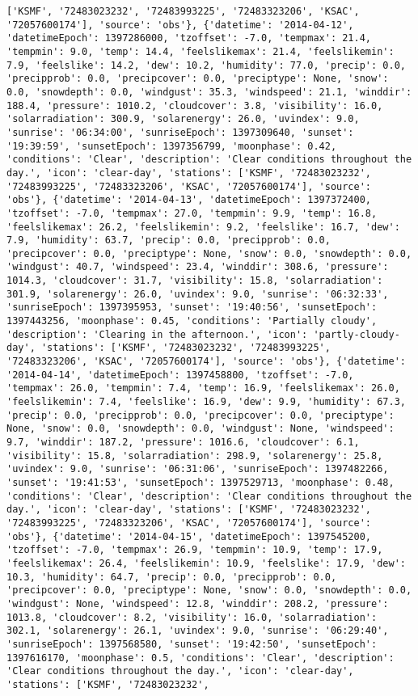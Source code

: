 \documentclass[
  letterpaper,
  DIV=11,
  numbers=noendperiod]{scrartcl}
\begin{document}
\begin{verbatim}
['KSMF', '72483023232', '72483993225', '72483323206', 'KSAC', '72057600174'], 'source': 'obs'}, {'datetime': '2014-04-12', 'datetimeEpoch': 1397286000, 'tzoffset': -7.0, 'tempmax': 21.4, 'tempmin': 9.0, 'temp': 14.4, 'feelslikemax': 21.4, 'feelslikemin': 7.9, 'feelslike': 14.2, 'dew': 10.2, 'humidity': 77.0, 'precip': 0.0, 'precipprob': 0.0, 'precipcover': 0.0, 'preciptype': None, 'snow': 0.0, 'snowdepth': 0.0, 'windgust': 35.3, 'windspeed': 21.1, 'winddir': 188.4, 'pressure': 1010.2, 'cloudcover': 3.8, 'visibility': 16.0, 'solarradiation': 300.9, 'solarenergy': 26.0, 'uvindex': 9.0, 'sunrise': '06:34:00', 'sunriseEpoch': 1397309640, 'sunset': '19:39:59', 'sunsetEpoch': 1397356799, 'moonphase': 0.42, 'conditions': 'Clear', 'description': 'Clear conditions throughout the day.', 'icon': 'clear-day', 'stations': ['KSMF', '72483023232', '72483993225', '72483323206', 'KSAC', '72057600174'], 'source': 'obs'}, {'datetime': '2014-04-13', 'datetimeEpoch': 1397372400, 'tzoffset': -7.0, 'tempmax': 27.0, 'tempmin': 9.9, 'temp': 16.8, 'feelslikemax': 26.2, 'feelslikemin': 9.2, 'feelslike': 16.7, 'dew': 7.9, 'humidity': 63.7, 'precip': 0.0, 'precipprob': 0.0, 'precipcover': 0.0, 'preciptype': None, 'snow': 0.0, 'snowdepth': 0.0, 'windgust': 40.7, 'windspeed': 23.4, 'winddir': 308.6, 'pressure': 1014.3, 'cloudcover': 31.7, 'visibility': 15.8, 'solarradiation': 301.9, 'solarenergy': 26.0, 'uvindex': 9.0, 'sunrise': '06:32:33', 'sunriseEpoch': 1397395953, 'sunset': '19:40:56', 'sunsetEpoch': 1397443256, 'moonphase': 0.45, 'conditions': 'Partially cloudy', 'description': 'Clearing in the afternoon.', 'icon': 'partly-cloudy-day', 'stations': ['KSMF', '72483023232', '72483993225', '72483323206', 'KSAC', '72057600174'], 'source': 'obs'}, {'datetime': '2014-04-14', 'datetimeEpoch': 1397458800, 'tzoffset': -7.0, 'tempmax': 26.0, 'tempmin': 7.4, 'temp': 16.9, 'feelslikemax': 26.0, 'feelslikemin': 7.4, 'feelslike': 16.9, 'dew': 9.9, 'humidity': 67.3, 'precip': 0.0, 'precipprob': 0.0, 'precipcover': 0.0, 'preciptype': None, 'snow': 0.0, 'snowdepth': 0.0, 'windgust': None, 'windspeed': 9.7, 'winddir': 187.2, 'pressure': 1016.6, 'cloudcover': 6.1, 'visibility': 15.8, 'solarradiation': 298.9, 'solarenergy': 25.8, 'uvindex': 9.0, 'sunrise': '06:31:06', 'sunriseEpoch': 1397482266, 'sunset': '19:41:53', 'sunsetEpoch': 1397529713, 'moonphase': 0.48, 'conditions': 'Clear', 'description': 'Clear conditions throughout the day.', 'icon': 'clear-day', 'stations': ['KSMF', '72483023232', '72483993225', '72483323206', 'KSAC', '72057600174'], 'source': 'obs'}, {'datetime': '2014-04-15', 'datetimeEpoch': 1397545200, 'tzoffset': -7.0, 'tempmax': 26.9, 'tempmin': 10.9, 'temp': 17.9, 'feelslikemax': 26.4, 'feelslikemin': 10.9, 'feelslike': 17.9, 'dew': 10.3, 'humidity': 64.7, 'precip': 0.0, 'precipprob': 0.0, 'precipcover': 0.0, 'preciptype': None, 'snow': 0.0, 'snowdepth': 0.0, 'windgust': None, 'windspeed': 12.8, 'winddir': 208.2, 'pressure': 1013.8, 'cloudcover': 8.2, 'visibility': 16.0, 'solarradiation': 302.1, 'solarenergy': 26.1, 'uvindex': 9.0, 'sunrise': '06:29:40', 'sunriseEpoch': 1397568580, 'sunset': '19:42:50', 'sunsetEpoch': 1397616170, 'moonphase': 0.5, 'conditions': 'Clear', 'description': 'Clear conditions throughout the day.', 'icon': 'clear-day', 'stations': ['KSMF', '72483023232', 
\end{verbatim}
\end{document}
